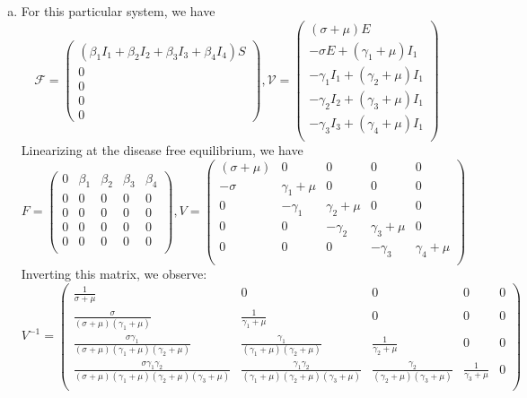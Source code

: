 \documentclass[12pt]{article}\usepackage[]{graphicx}\usepackage[]{color}
\begin{document}
\begin{enumerate}[(a)]
  \item \Rc
{\color{blue} {
For this particular system, we have
$$
\mathcal{F} = \begin{pmatrix}
(\beta_1 I_1 + \beta_2 I_2 + \beta_3 I_3 + \beta_4 I_4) S\\
0\\
0\\
0\\
0
\end{pmatrix}, \mathcal{V} = \begin{pmatrix}
(\sigma + \mu) E \\
- \sigma E + (\gamma_1 + \mu) I_1\\
- \gamma_1 I_1 + (\gamma_2 + \mu) I_1\\
- \gamma_2 I_2 + (\gamma_3 + \mu) I_1\\
- \gamma_3 I_3 + (\gamma_4 + \mu) I_1\\
\end{pmatrix}
$$
Linearizing at the disease free equilibrium, we have
$$
F = \begin{pmatrix}
0 & \beta_1 & \beta_2 & \beta_3 & \beta_4\\
0 & 0 & 0 & 0 & 0\\
0 & 0 & 0 & 0 & 0\\
0 & 0 & 0 & 0 & 0\\
0 & 0 & 0 & 0 & 0\\
\end{pmatrix},
V = \begin{pmatrix}
(\sigma + \mu) & 0 & 0 & 0 & 0\\
- \sigma & \gamma_1 + \mu & 0 & 0 & 0\\
0 & - \gamma_1 & \gamma_2 + \mu & 0 & 0\\
0 & 0 & - \gamma_2 & \gamma_3 + \mu & 0\\
0 & 0 & 0 & - \gamma_3 & \gamma_4 + \mu\\
\end{pmatrix}
$$
Inverting this matrix, we observe:
$$
V^{-1} = \begin{pmatrix}
\frac{1}{\sigma + \mu} & 0 & 0 & 0 & 0\\
\frac{\sigma}{(\sigma + \mu)(\gamma_1 + \mu)} & \frac{1}{\gamma_1 + \mu} & 0 & 0 & 0\\
\frac{\sigma \gamma_1}{(\sigma + \mu)(\gamma_1 + \mu)(\gamma_2 + \mu)} & \frac{\gamma_1}{(\gamma_1 + \mu)(\gamma_2 + \mu)} & \frac{1}{\gamma_2 + \mu} & 0 & 0\\
\frac{\sigma \gamma_1 \gamma_2}{(\sigma + \mu)(\gamma_1 + \mu)(\gamma_2 + \mu)(\gamma_3 + \mu)} & \frac{\gamma_1 \gamma_2}{(\gamma_1 + \mu)(\gamma_2 + \mu)(\gamma_3 + \mu)} & \frac{\gamma_2}{(\gamma_2 + \mu)(\gamma_3 + \mu)} & \frac{1}{\gamma_3 + \mu} & 0\\

\end{pmatrix}$$}}
\end{enumerate}
\end{document}
